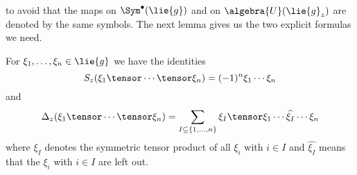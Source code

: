 to avoid that the maps on $\Sym^{\bullet}(\lie{g})$ and on $\algebra{U}
(\lie{g}_z)$ are denoted by the same symbols. The next lemma gives us the two 
explicit formulas we need.
\begin{lemma}
    \label{Thm:Hopf:Formulas}%
    For $\xi_1, \ldots, \xi_n \in \lie{g}$ we have the identities
    \begin{equation}
        \label{Hopf:AntipodeFormula}
        S_z(\xi_1 \tensor \cdots \tensor \xi_n)
        =
        (-1)^n
        \xi_1 \cdots \xi_n
    \end{equation}
    and
    \begin{equation}
        \label{Hopf:CoproductFormula}
        \ocoproduct_z(\xi_1 \tensor \cdots \tensor \xi_n)
        =
        \sum\limits_{
        	I \subseteq
        	\{1, \ldots, n\}
        }
        \xi_I
        \tensor
        \xi_1 \cdots
        \widehat{\xi_I}
        \cdots \xi_n
    \end{equation}
    where $\xi_I$ denotes the symmetric tensor product of all $\xi_i$ with 
    $i \in I$ and $\widehat{\xi_I}$ means that the $\xi_i$ with $i \in I$ 
    are left out.
\end{lemma}
